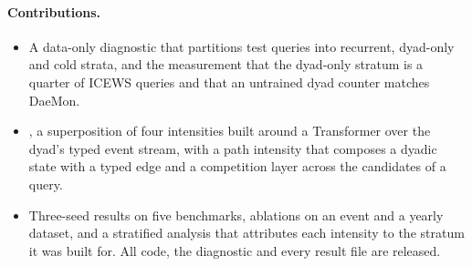 \paragraph{Contributions.}
\begin{itemize}\setlength\itemsep{0pt}
  \item A data-only diagnostic that partitions test queries into recurrent, dyad-only and cold strata, and the measurement that the dyad-only stratum is a quarter of ICEWS queries and that an untrained dyad counter matches DaeMon.
  \item \model{}, a superposition of four intensities built around a Transformer over the dyad's typed event stream, with a path intensity that composes a dyadic state with a typed edge and a competition layer across the candidates of a query.
  \item Three-seed results on five benchmarks, ablations on an event and a yearly dataset, and a stratified analysis that attributes each intensity to the stratum it was built for. All code, the diagnostic and every result file are released.
\end{itemize}
